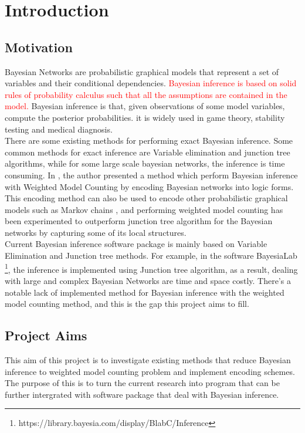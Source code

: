 
\section{Introduction}
    \subsection{Motivation}
    Bayesian Networks are probabilistic graphical models that represent a set of variables and their conditional dependencies.
    \textcolor{red}{Bayesian inference is based on solid rules of probability calculus such that all the assumptions are contained in the model.} Bayesian inference is that, given observations of some model variables, compute the posterior probabilities. it is widely used in game theory, stability testing and medical diagnosis. \\
    
    \noindent There are some existing methods for performing exact Bayesian inference. Some common methods for exact inference are Variable elimination and junction tree algorithms, while for some large scale bayesian networks, the inference is  time consuming. In \cite{enc1}, the author presented a method which perform Bayesian inference with Weighted Model Counting by encoding Bayesian networks into logic forms. This encoding method can also be used to encode other probabilistic graphical models such as Markov chains \cite{2008-literature-review}, and performing weighted model counting has been experimented to outperform junction tree algorithm for the Bayesian networks by capturing some of its local structures.\\
    
    \noindent Current Bayesian inference software package is mainly based on Variable Elimination and Junction tree methods. For example, in the software BayesiaLab \footnote{https://library.bayesia.com/display/BlabC/Inference}, the inference is implemented using Junction tree algorithm, as a result, dealing with large and complex Bayesian Networks are time and space costly. There's a notable lack of implemented method for Bayesian inference with the weighted model counting method, and this is the gap this project aims to fill.
    
    \subsection{Project Aims}
    This aim of this project is to investigate existing methods that reduce Bayesian inference to weighted model counting problem and implement encoding schemes. The purpose of this is to turn the current research into program that can be further intergrated with software package that deal with Bayesian inference.\\
    
